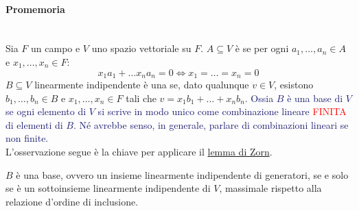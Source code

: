 \paragraph*{Promemoria}\mbox{}\\
Sia $F$ un campo e $V$ uno spazio vettoriale su $F$. $A \subseteq V$ è  se per ogni $a_1,\ldots,a_n \in A$ e $x_1,\ldots,x_n \in F$:
\[ x_1a_1 + \ldots x_na_n = 0 \iff x_1 = \ldots = x_n = 0
	\]
$B \subseteq V$ linearmente indipendente è una  se, dato qualunque $v \in V$, esistono $b_1,\ldots,b_n \in B$ e $x_1,\ldots,x_n \in F$ tali che $v = x_1b_1+\ldots+x_nb_n$.
\textcolor{MidnightBlue}{Ossia $B$ è una base di $V$ se ogni elemento di $V$ si scrive in modo unico come combinazione lineare \textcolor{red}{FINITA} di elementi di $B$. Né avrebbe senso, in generale, parlare di combinazioni lineari se non finite.}\\

L'osservazione segue è la chiave per applicare il \hyperref[Zorn]{lemma di Zorn}.

\begin{remark}
	$B$ è una base, ovvero un insieme linearmente indipendente di generatori, se e solo se è un sottoinsieme linearmente indipendente di $V$, massimale rispetto alla relazione d'ordine di inclusione.
\end{remark}


